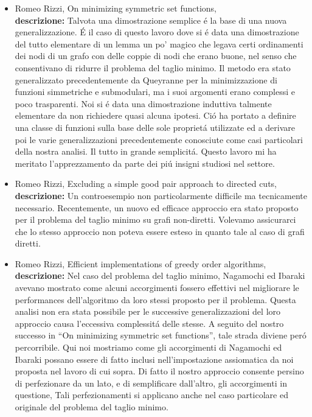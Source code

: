 \documentclass[10pt]{article}
\begin{document}
\begin{itemize}
  \vspace{1.4mm}
  \item[] {\sc Romeo Rizzi},
   \newblock  On minimizing symmetric set functions,
   \\
{\bf descrizione:}
Talvota una dimostrazione semplice \'e la base
di una nuova generalizzazione.
\'E il caso di questo lavoro dove si \'e data
una dimostrazione del tutto elementare
di un lemma un po' magico che legava
certi ordinamenti dei nodi di un grafo
con delle coppie di nodi che erano buone,
nel senso che consentivano di ridurre
il problema del taglio minimo.
Il metodo era stato generalizzato precedentemente da
Queyranne per la minimizzazione
di funzioni simmetriche e submodulari,
ma i suoi argomenti erano complessi e poco trasparenti.
Noi si \'e data una dimostrazione induttiva
talmente elementare da non richiedere
quasi alcuna ipotesi.
Ci\'o ha portato a definire una classe di funzioni
sulla base delle sole propriet\'a utilizzate
ed a derivare poi le varie generalizzazioni precedentemente
conosciute come casi particolari
della nostra analisi.
Il tutto in grande semplicit\'a.
Questo lavoro mi ha meritato l'apprezzamento da parte
dei pi\'u insigni studiosi nel settore.\\

  \vspace{1.4mm}
  \item[] {\sc Romeo Rizzi},
   \newblock  Excluding a simple good pair approach to directed cuts,
   \\
{\bf descrizione:}
Un controesempio non particolarmente difficile ma tecnicamente
necessario.
Recentemente, un nuovo ed efficace approccio
era stato proposto per
il problema del taglio minimo
su grafi non-diretti.
Volevamo assicurarci che lo stesso approccio
non poteva essere esteso in quanto tale al caso di grafi diretti.\\

  \vspace{1.4mm}
  \item[] {\sc Romeo Rizzi},
   \newblock  Efficient implementations of greedy order algorithms,
    \\
{\bf descrizione:}
Nel caso del problema del taglio minimo,
Nagamochi ed Ibaraki avevano mostrato come
alcuni accorgimenti fossero effettivi nel migliorare
le performances dell'algoritmo da loro stessi proposto
per il problema.
Questa analisi non era stata possibile per
le successive generalizzazioni del loro approccio causa
l'eccessiva complessit\'a delle stesse.
A seguito del nostro successo
in ``On minimizing symmetric set functions'',
tale strada diviene per\'o percorribile.
Qui noi mostriamo come gli accorgimenti di Nagamochi ed Ibaraki
possano essere di fatto inclusi
nell'impostazione assiomatica da noi proposta
nel lavoro di cui sopra.
Di fatto il nostro approccio
consente persino di perfezionare da un lato,
e di semplificare dall'altro,
gli accorgimenti in questione,
Tali perfezionamenti si applicano
anche nel caso particolare ed originale
del problema del taglio minimo.\\


\end{itemize}
\end{document}
